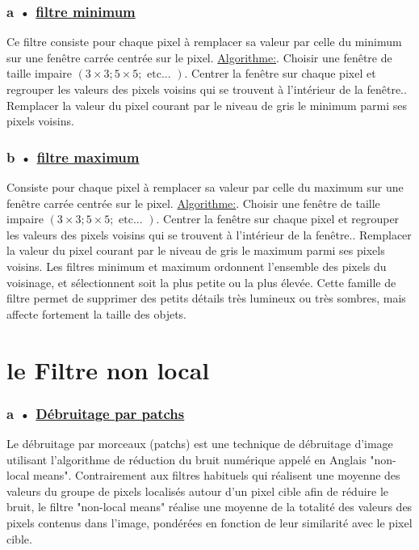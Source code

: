 \documentclass[12pt,a4paper]{report}
\numberwithin{equation}{subsection}
\numberwithin{equation}{section}
\begin{document}
\subsubsection{a • \underline {filtre minimum}}
Ce filtre consiste pour chaque pixel à remplacer sa valeur par celle du minimum sur une fenêtre carrée centrée sur le pixel.\newline
\underline {Algorithme:}. Choisir une fenêtre de taille impaire $(3 \times 3 ; 5 \times 5 ; \text { etc... })$. Centrer la fenêtre sur chaque pixel et regrouper les valeurs des pixels voisins qui se trouvent à l'intérieur de la fenêtre.. Remplacer la valeur du pixel courant par le niveau de gris le minimum parmi ses pixels voisins.\newline
\subsubsection{b • \underline {filtre maximum}}
Consiste pour chaque pixel à remplacer sa valeur par celle du maximum sur une fenêtre carrée centrée sur le pixel.\newline
\underline {Algorithme:}. Choisir une fenêtre de taille impaire $(3 \times 3 ; 5 \times 5 ; \text { etc... })$. Centrer la fenêtre sur chaque pixel et regrouper les valeurs des pixels voisins qui se trouvent à l'intérieur de la fenêtre.. Remplacer la valeur du pixel courant par le niveau de gris le maximum parmi ses pixels voisins.\newline
\newline
Les filtres minimum et maximum ordonnent l'ensemble des pixels du voisinage, et sélectionnent soit la plus petite ou la plus élevée. Cette famille de filtre permet de supprimer des petits détails très lumineux ou très sombres, mais affecte fortement la taille des objets.
\section{le Filtre non local }
\subsubsection{a • \underline {Débruitage par patchs}}
Le débruitage par morceaux (patchs) est une technique de débruitage d'image utilisant l'algorithme de réduction du bruit numérique appelé en Anglais "non-local means". Contrairement aux filtres habituels qui réalisent une moyenne des valeurs du groupe de pixels localisés autour d'un pixel cible afin de réduire le bruit, le filtre "non-local means" réalise une moyenne de la totalité des valeurs des pixels contenus dans l'image, pondérées en fonction de leur similarité avec le pixel cible. 
\end{document}
